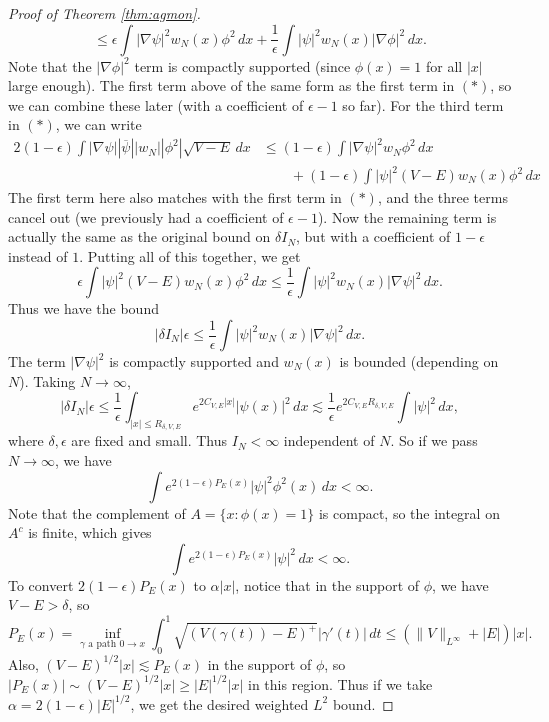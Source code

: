 \begin{proof}[Proof of Theorem \ref{thm:agmon}]
\[    \le \epsilon \int |\nabla \psi|^2 w_N(x) \phi^2\, dx
    + \frac{1}{\epsilon} \int |\psi|^2 w_N(x) |\nabla \phi|^2\, dx.
  \]
  Note that the $|\nabla \phi|^2$ term is compactly
  supported (since $\phi(x) = 1$ for all $|x|$ large
  enough). The first term above of the same form
  as the first term in $(*)$, so we can combine these
  later (with a coefficient of $\epsilon - 1$
  so far). For the third term in $(*)$, we can write
  \begin{align*}
    2(1 - \epsilon) \int |\nabla \psi| |\overline{\psi}| |w_N| |\phi^2| \sqrt{V - E}\, dx
    &\le (1 - \epsilon) \int |\nabla \psi|^2 w_N \phi^2\, dx \\
    &\quad \quad + (1 - \epsilon) \int |\psi|^2 (V - E) w_N(x) \phi^2\, dx
  \end{align*}
  The first term here also matches with the
  first term in $(*)$, and the three terms cancel
  out (we previously had a coefficient of $\epsilon - 1$).
  Now the remaining term is actually the same
  as the original bound on $\delta I_N$, but with a
  coefficient of $1 - \epsilon$ instead of $1$. Putting
  all of this together, we get
  \[
    \epsilon \int |\psi|^2 (V - E) w_N(x) \phi^2\, dx
    \le \frac{1}{\epsilon} \int |\psi|^2 w_N(x) |\nabla \psi|^2\, dx.
  \]
  Thus we have the bound
  \[
    |\delta I_N| \epsilon \le \frac{1}{\epsilon} \int |\psi|^2 w_N(x) |\nabla \psi|^2\, dx.
  \]
  The term $|\nabla \psi|^2$ is compactly supported
  and $w_N(x)$ is bounded (depending on $N$).
  Taking $N \to \infty$,
  \[
    |\delta I_N| \epsilon
    \le \frac{1}{\epsilon} \int_{|x| \le R_{\delta, V, E}} e^{2C_{V, E} |x|} |\psi(x)|^2\, dx
    \lesssim \frac{1}{\epsilon} e^{2C_{V, E} R_{\delta, V, E}} \int |\psi|^2\, dx,
  \]
  where $\delta, \epsilon$ are fixed and small.
  Thus $I_N < \infty$ independent of $N$.
  So if we pass $N \to \infty$, we have
  \[
    \int e^{2(1 - \epsilon) P_E(x)} |\psi|^2 \phi^2(x)\, dx < \infty.
  \]
  Note that
  the complement of $A = \{x : \phi(x) = 1\}$ is
  compact, so the integral on $A^c$ is finite, which
  gives
  \[
    \int e^{2(1 - \epsilon) P_E(x)} |\psi|^2\, dx < \infty.
  \]
  To convert $2(1 - \epsilon) P_E(x)$ to $\alpha |x|$,
  notice that in the support of $\phi$,
  we have $V - E > \delta$, so
  \[
    P_E(x) = \inf_{\text{$\gamma$ a path $0 \to x$}}
    \int_0^1 \sqrt{(V(\gamma(t)) - E)^+} |\gamma'(t)|\, dt
    \le (\|V\|_{L^\infty} + |E|) |x|.
  \]
  Also, $(V - E)^{1 / 2} |x| \lesssim P_E(x)$
  in the support of $\phi$, so
  $|P_E(x)| \sim (V - E)^{1 / 2} |x| \ge |E|^{1 / 2} |x|$ in this region.
  Thus if we take $\alpha = 2(1 - \epsilon) |E|^{1 / 2}$,
  we get the desired weighted $L^2$ bound.


\end{proof}
